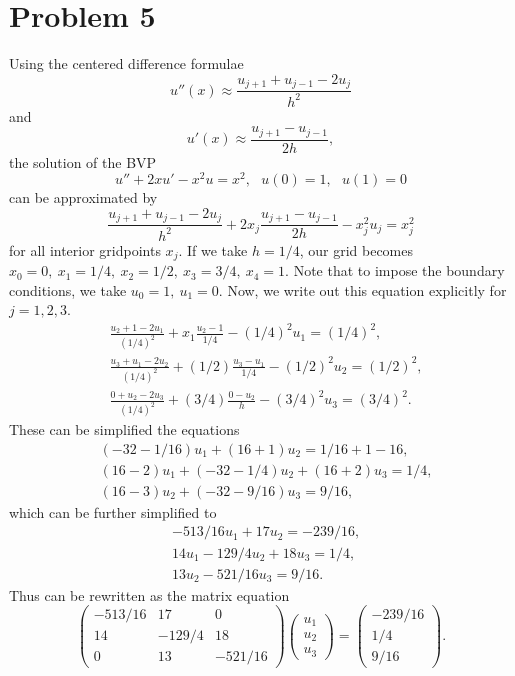 \documentclass{article}
\begin{document}
\section{Problem 5}
Using the centered difference formulae 
\[
u''(x)\approx\frac{u_{j+1}+u_{j-1}-2u_j}{h^2}
\]
and 
\[
u'(x)\approx\frac{u_{j+1}-u_{j-1}}{2h},
\]
the solution of the BVP \[u'' + 2xu' - x^2 u = x^2 ,~~~u(0)=1,~~~u(1) = 0\] can be approximated by 
\[
\frac{u_{j+1}+u_{j-1}-2u_j}{h^2}+2x_j\frac{u_{j+1}-u_{j-1}}{2h}-x_j^2u_j=x_j^2
\]
for all interior gridpoints $x_j$. If we take $h=1/4$, our grid becomes $x_0=0,~ x_1=1/4,~ x_2=1/2,~ x_3=3/4,~ x_4=1$. Note that to impose the boundary conditions, we take $u_0=1,~ u_1=0$. Now, we write out this equation explicitly for $j=1,2,3$.
\begin{equation*}
\begin{split}
&\frac{u_{2}+1-2u_1}{(1/4)^2}+x_1\frac{u_{2}-1}{1/4}-(1/4)^2u_1=(1/4)^2,\\
&\frac{u_{3}+u_{1}-2u_2}{(1/4)^2}+(1/2)\frac{u_{3}-u_{1}}{1/4}-(1/2)^2u_2=(1/2)^2,\\
&\frac{0+u_{2}-2u_3}{(1/4)^2}+(3/4)\frac{0-u_2}{h}-(3/4)^2u_3=(3/4)^2.
\end{split}
\end{equation*}
These can be simplified the equations
\begin{equation*}
\begin{split}
&(-32-1/16)u_1+(16+1)u_2=1/16+1-16,\\
&(16-2)u_1+(-32-1/4)u_2+(16+2)u_3=1/4,\\
&(16-3)u_2+(-32-9/16)u_3=9/16,
\end{split}
\end{equation*}
which can be further simplified to
\begin{equation*}
\begin{split}
&-513/16u_1+17u_2=-239/16,\\
&14u_1-129/4u_2+18u_3=1/4,\\
&13u_2-521/16u_3=9/16.
\end{split}
\end{equation*}
Thus can be rewritten as the matrix equation
\[
\begin{pmatrix}
-513/16&17&0\\
14&-129/4&18\\
0&13&-521/16
\end{pmatrix}
\begin{pmatrix}
u_1\\u_2\\u_3
\end{pmatrix}=\begin{pmatrix}
-239/16\\1/4\\9/16
\end{pmatrix}.
\]
\end{document}
